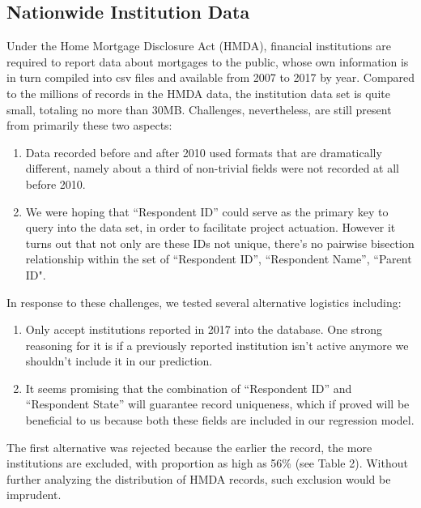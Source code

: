 \documentclass[conference,compsoc]{IEEEtran}
\begin{document}
\subsection{Nationwide Institution Data}

Under the Home Mortgage Disclosure Act (HMDA), financial institutions are required to report data about mortgages to the public, whose own information is in turn compiled into csv files and available from 2007 to 2017 by year. Compared to the millions of records in the HMDA data, the institution data set is quite small, totaling no more than 30MB. Challenges, nevertheless, are still present from primarily these two aspects: 

\begin{enumerate}
\item Data recorded before and after 2010 used formats that are dramatically different, namely about a third of non-trivial fields were not recorded at all before 2010. 
\item We were hoping that “Respondent ID” could serve as the primary key to query into the data set, in order to facilitate project actuation. However it turns out that not only are these IDs not unique, there’s no pairwise bisection relationship within the set of {“Respondent ID”, “Respondent Name”,  “Parent ID"}. 
\end{enumerate}


In response to these challenges, we tested several alternative logistics including:  
\begin{enumerate}

\item Only accept institutions reported in 2017 into the database. One strong reasoning for it is if a previously reported institution isn’t active anymore we shouldn’t include it in our prediction.
\item  It seems promising that the combination of “Respondent ID” and “Respondent State” will guarantee record uniqueness, which if proved will be beneficial to us because both these fields are included in our regression model.

\end{enumerate}



The first alternative was rejected because the earlier the record, the more institutions are excluded, with proportion as high as 56\% (see Table 2). Without further analyzing the distribution of HMDA records, such exclusion would be imprudent.
\end{document}
